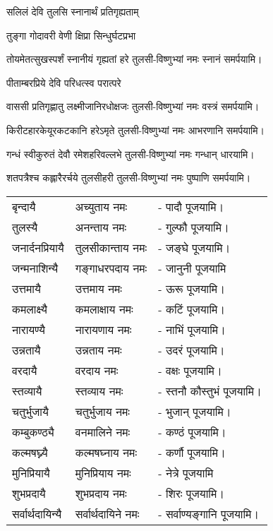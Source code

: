 \begin{center}
{सलिलं देवि तुलसि स्नानार्थं प्रतिगृह्यताम्}

{तुङ्गा गोदावरी वेणी क्षिप्रा सिन्धुर्घटप्रभा}

{तोयमेतत्सुखस्पर्शं स्नानीयं गृह्यतां हरे}
\hfill{}तुलसी-विष्णुभ्यां नमः स्नानं समर्पयामि।

{पीताम्बरप्रिये देवि परिधत्स्व परात्परे}

{वाससी प्रतिगृह्णातु लक्ष्मीजानिरधोक्षजः}
\hfill{}तुलसी-विष्णुभ्यां नमः वस्त्रं समर्पयामि।

{किरीटहारकेयूरकटकानि हरेऽमृते}
\hfill{}तुलसी-विष्णुभ्यां नमः आभरणानि समर्पयामि।

{गन्धं स्वीकुरुतं देवौ रमेशहरिवल्लभे}
\hfill{}तुलसी-विष्णुभ्यां नमः गन्धान् धारयामि।

{शतपत्रैश्च कह्लारैरर्चये तुलसीहरी}
\hfill{}तुलसी-विष्णुभ्यां नमः पुष्पाणि समर्पयामि।
\end{center}



\begin{tabular}{ll@{}l}
बृन्दायै &  अच्युताय नमः & - पादौ पूजयामि।\\
तुलस्यै & अनन्ताय   नमः  &- गुल्फौ पूजयामि।\\
जनार्दनप्रियायै &  तुलसीकान्ताय नमः & - जङ्घे पूजयामि।\\
जन्मनाशिन्यै &  गङ्गाधरपदाय नमः & - जानुनी पूजयामि \\
उत्तमायै &  उत्तमाय नमः & - ऊरू पूजयामि।\\
कमलाक्ष्यै &  कमलाक्षाय नमः & - कटिं पूजयामि।\\
नारायण्यै &  नारायणाय नमः & - नाभिं पूजयामि।\\
उन्नतायै &  उन्नताय नमः & - उदरं पूजयामि।\\
वरदायै &  वरदाय नमः & - वक्षः पूजयामि।\\
स्तव्यायै &  स्तव्याय नमः & - स्तनौ कौस्तुभं पूजयामि।\\
चतुर्भुजायै &  चतुर्भुजाय नमः & - भुजान् पूजयामि।\\
कम्बुकण्ठ्यै &  वनमालिने नमः & - कण्ठं पूजयामि।\\
कल्मषघ्न्यै &  कल्मषघ्नाय नमः & - कर्णौ पूजयामि।\\
मुनिप्रियायै &  मुनिप्रियाय नमः & - नेत्रे पूजयामि\\
शुभप्रदायै &  शुभप्रदाय नमः & - शिरः पूजयामि।\\
सर्वार्थदायिन्यै &  सर्वार्थदायिने नमः & - सर्वाण्यङ्गानि पूजयामि। \\
\end{tabular}


